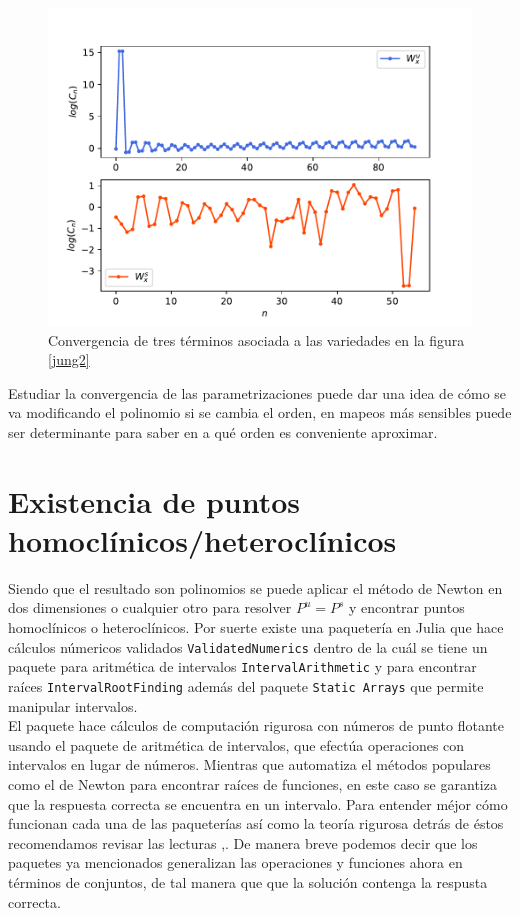 \begin{figure}[H]
\centering
\includegraphics[scale=0.5]{convergenciaJungT57}
\caption{Convergencia de tres términos asociada a las variedades en la figura \ref{jung2}}
\label{convergenciaJ3}
\end{figure}

Estudiar la convergencia de las parametrizaciones puede dar una idea de cómo se va modificando el polinomio si se cambia el orden, en mapeos más sensibles puede ser determinante para saber en a qué orden es conveniente aproximar. 

\section{Existencia de puntos homoclínicos/heteroclínicos}

Siendo que el resultado son polinomios se puede aplicar el método de Newton en dos dimensiones o cualquier otro para resolver $P^{u}=P^{s}$ y encontrar puntos homoclínicos o heteroclínicos. Por suerte existe una paquetería en Julia que hace cálculos númericos validados \texttt{ValidatedNumerics}\cite{validated} dentro de la cuál se tiene un paquete para aritmética de intervalos \texttt{IntervalArithmetic}\citep{interval} y para encontrar raíces \texttt{IntervalRootFinding}\cite{root} además del paquete \texttt{Static Arrays}\cite{static} que permite manipular intervalos.\\ 

El paquete \cite{validated} hace cálculos de computación rigurosa con números de punto flotante usando el paquete de aritmética de intervalos, que efectúa operaciones con intervalos en lugar de números. Mientras que \cite{root} automatiza el métodos populares como el de Newton para encontrar raíces de funciones, en este caso se garantiza que la respuesta correcta se encuentra en un intervalo. Para entender méjor cómo funcionan cada una de las paqueterías así como la teoría rigurosa detrás de éstos recomendamos revisar las lecturas \cite{ramon},\cite{Numerics}. De manera breve podemos decir que los paquetes ya mencionados generalizan las operaciones y funciones ahora en términos de conjuntos, de tal manera que que la solución contenga la respusta correcta. \\

